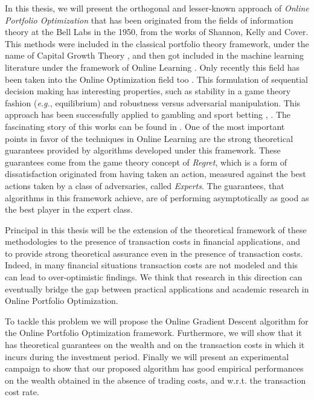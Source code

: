 In this thesis, we will present the orthogonal and lesser-known approach of \emph{Online Portfolio Optimization} that has been originated from the fields of information theory at the Bell Labs in the 1950, from the works of Shannon, Kelly and Cover. This methods were included in the classical portfolio theory framework, under the name of Capital Growth Theory \cite{hakansson1995capital}, and then got included in the machine learning literature under the framework of Online Learning \cite{cesa2006prediction}. Only recently this field has been taken into the Online Optimization field too \cite{hazan2016introduction}. This formulation of sequential decision making has interesting properties, such as stability in a game theory fashion (\emph{e.g.}, equilibrium) and robustness versus adversarial manipulation.
This approach has been successfully applied to gambling and sport betting \cite{thorp1966beat}, \cite{hausch1981efficiency}. The fascinating story of this works can be found in \cite{poundstone2010fortune}.
One of the most important points in favor of the techniques in Online Learning are the strong theoretical guarantees provided by algorithms developed under this framework. These guarantees come from the game theory concept of \emph{Regret}, which is a form of dissatisfaction originated from having taken an action, measured against the best actions taken by a class of  adversaries, called \emph{Experts}. The guarantees, that algorithms in this framework achieve, are of performing asymptotically as good as the best player in the expert class.

Principal in this thesis will be the extension of the theoretical framework of these methodologies to the presence of transaction costs in financial applications, and to provide strong theoretical assurance even in the presence of transaction costs. Indeed, in many financial situations transaction costs are not modeled and this can lead to over-optimistic findings. We think that research in this direction can eventually bridge the gap between practical applications and academic research in Online Portfolio Optimization.

To tackle this problem we will propose the Online Gradient Descent algorithm for the Online Portfolio Optimization framework. Furthermore, we will show that it has theoretical guarantees on the wealth and on the transaction costs in which it incurs during the investment period. Finally we will present an experimental campaign to show that our proposed algorithm has good empirical performances on the wealth obtained in the absence of trading costs, and w.r.t. the transaction cost rate.

